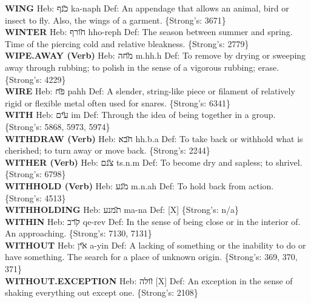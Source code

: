 {\textbf{WING} Heb: {\large\H כנף} ka-naph Def: An appendage that allows an animal, bird or insect to fly. Also, the wings of a garment. \{Strong's: 3671\}\hfill{}\\

\textbf{WINTER} Heb: {\large\H חורף} hho-reph Def: The season between summer and spring. Time of the piercing cold and relative bleakness. \{Strong's: 2779\}\hfill{}\\

\textbf{WIPE.AWAY (Verb)} Heb: {\large\H מחה} m.hh.h Def: To remove by drying or sweeping away through rubbing; to polish in the sense of a vigorous rubbing; erase. \{Strong's: 4229\}\hfill{}\\

\textbf{WIRE} Heb: {\large\H פח} pahh Def: A slender, string-like piece or filament of relatively rigid or flexible metal often used for snares. \{Strong's: 6341\}\hfill{}\\

\textbf{WITH} Heb: {\large\H עים} im Def: Through the idea of being together in a group. \{Strong's: 5868, 5973, 5974\}\hfill{}\\

\textbf{WITHDRAW (Verb)} Heb: {\large\H חבא} hh.b.a Def: To take back or withhold what is cherished; to turn away or move back. \{Strong's: 2244\}\hfill{}\\

\textbf{WITHER (Verb)} Heb: {\large\H צנם} ts.n.m Def: To become dry and sapless; to shrivel. \{Strong's: 6798\}\hfill{}\\

\textbf{WITHHOLD (Verb)} Heb: {\large\H מנע} m.n.ah Def: To hold back from action. \{Strong's: 4513\}\hfill{}\\

\textbf{WITHHOLDING} Heb: {\large\H תמנע} ma-na Def: {[}X{]} \{Strong's: n/a\}\hfill{}\\

\textbf{WITHIN} Heb: {\large\H קרב} qe-rev Def: In the sense of being close or in the interior of. An approaching. \{Strong's: 7130, 7131\}\hfill{}\\

\textbf{WITHOUT} Heb: {\large\H אין} a-yin Def: A lacking of something or the inability to do or have something. The search for a place of unknown origin. \{Strong's: 369, 370, 371\}\hfill{}\\

\textbf{WITHOUT.EXCEPTION} Heb: {\large\H זולה} {[}X{]} Def: An exception in the sense of shaking everything out except one. \{Strong's: 2108\}\hfill{}\\

}
